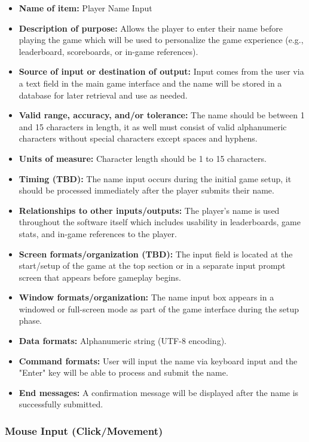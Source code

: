 \documentclass{article}
\begin{document}
\begin{itemize}
    \item \textbf{Name of item:} Player Name Input
    \item \textbf{Description of purpose:} Allows the player to enter their name before playing the game which will be used to personalize the game experience (e.g., leaderboard, scoreboards, or in-game references).
    \item \textbf{Source of input or destination of output:} Input comes from the user via a text field in the main game interface and the name will be stored in a database for later retrieval and use as needed.
    \item \textbf{Valid range, accuracy, and/or tolerance:} The name should be between 1 and 15 characters in length, it as well must consist of valid alphanumeric characters without special characters except spaces and hyphens.
    \item \textbf{Units of measure:} Character length should be 1 to 15 characters.
    \item \textbf{Timing (TBD):} The name input occurs during the initial game setup, it should be processed immediately after the player submits their name.
    \item \textbf{Relationships to other inputs/outputs:} The player’s name is used throughout the software itself which includes usability in leaderboards, game stats, and in-game references to the player.
    \item \textbf{Screen formats/organization (TBD):} The input field is located at the start/setup of the game at the top section or in a separate input prompt screen that appears before gameplay begins.
    \item \textbf{Window formats/organization:} The name input box appears in a windowed or full-screen mode as part of the game interface during the setup phase.
    \item \textbf{Data formats:} Alphanumeric string (UTF-8 encoding).
    \item \textbf{Command formats:} User will input the name via keyboard input and the "Enter" key will be able to process and submit the name.
    \item \textbf{End messages:} A confirmation message will be displayed after the name is successfully submitted.
\end{itemize}

\subsubsection{Mouse Input (Click/Movement)}
\end{document}
